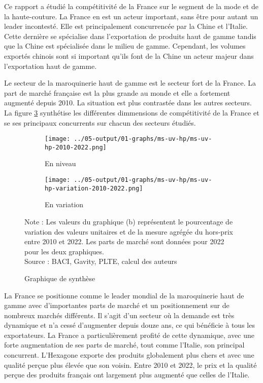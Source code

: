 \documentclass[french,10pt,a4paper]{article}
\begin{document}
Ce rapport a étudié la compétitivité de la France sur le segment de la mode et de la haute-couture. La France en est un acteur important, sans être pour autant un leader incontesté. Elle est principalement concurrencée par la Chine et l'Italie. Cette dernière se spécialise dans l'exportation de produits haut de gamme tandis que la Chine est spécialisée dans le milieu de gamme. Cependant, les volumes exportés chinois sont si important qu'ils font de la Chine un acteur majeur dans l'exportation haut de gamme.

Le secteur de la maroquinerie haut de gamme est le secteur fort de la France. La part de marché française est la plus grande au monde et elle a fortement augmenté depuis 2010. La situation est plus contrastée dans les autres secteurs. La figure \ref{fig:graph-synthese} synthétise les différentes dimmensions de compétitivité de la France et se ses principaux concurrents sur chacun des secteurs étudiés. 

\begin{figure}[!h]
  \centering
  \begin{subfigure}{\textwidth}
    \centering    \texttt{[image: ../05-output/01-graphs/ms-uv-hp/ms-uv-hp-2010-2022.png]}
    \caption{En niveau}
    \label{fig:ms-uv-hp}
  \end{subfigure}
  \vspace{0.5cm}
  \begin{subfigure}{\textwidth}
    \centering \texttt{[image: ../05-output/01-graphs/ms-uv-hp/ms-uv-hp-variation-2010-2022.png]}
 \caption{En variation}
 \label{fig:ms-uv-hp-variation}
  \end{subfigure}
  \captionsetup{justification=justified, singlelinecheck=false, font=small}
  \caption*{Note : Les valeurs du graphique (b) représentent le pourcentage de variation des valeurs unitaires et de la mesure agrégée du hors-prix entre 2010 et 2022. Les parts de marché sont données pour 2022 pour les deux graphiques.\\
  Source : BACI, Gavity, PLTE, calcul des auteurs}
  \captionsetup{justification=centering, singlelinecheck=true, font=normalsize}
  \caption{Graphique de synthèse}
  \label{fig:graph-synthese}
\end{figure}

\bigskip

La France se positionne comme le leader mondial de la maroquinerie haut de gamme avec d'importantes parts de marché et un positionnement sur de nombreux marchés différents. Il s'agit d'un secteur où la demande est très dynamique et n'a cessé d'augmenter depuis douze ans, ce qui bénéficie à tous les exportateurs. La France a particulièrement profité de cette dynamique, avec une forte augmentation de ses parts de marché, tout comme l'Italie, son principal concurrent. L'Hexagone exporte des produits globalement plus chers et avec une qualité perçue plus élevée que son voisin. Entre 2010 et 2022, le prix et la qualité perçue des produits français ont largement plus augmenté que celles de l'Italie.
\end{document}
